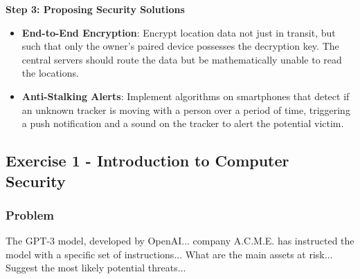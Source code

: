 \documentclass{article}
\begin{document}
\textbf{Step 3: Proposing Security Solutions}
\begin{itemize}
    \item[\textbf{1.}] \textbf{End-to-End Encryption}: Encrypt location data not just in transit, but such that only the owner's paired device possesses the decryption key. The central servers should route the data but be mathematically unable to read the locations.
    \item[\textbf{2.}] \textbf{Anti-Stalking Alerts}: Implement algorithms on smartphones that detect if an unknown tracker is moving with a person over a period of time, triggering a push notification and a sound on the tracker to alert the potential victim.
\end{itemize}

\subsection{Exercise 1 - Introduction to Computer Security}
\subsubsection*{Problem}
The GPT-3 model, developed by OpenAI... company A.C.M.E. has instructed the model with a specific set of instructions... What are the main assets at risk... Suggest the most likely potential threats...
\end{document}
